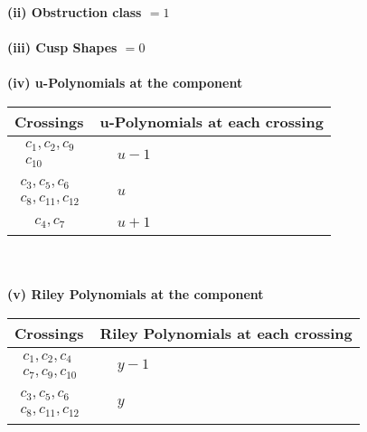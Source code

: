 \documentclass[1p]{elsarticle_modified}
\theoremstyle{definition}
\begin{document}
\flushleft \textbf{(ii) Obstruction class $= 1$}\\~\\
\flushleft \textbf{(iii) Cusp Shapes $= 0$}\\~\\
\newpage\renewcommand{\arraystretch}{1}
\flushleft \textbf{(iv) u-Polynomials at the component}\newline \\
\begin{tabular}{m{50pt}|m{274pt}}
Crossings & \hspace{64pt}u-Polynomials at each crossing \\
\hline $$\begin{aligned}c_{1},c_{2},c_{9}\\c_{10}\end{aligned}$$&$\begin{aligned}
&u-1
\end{aligned}$\\
\hline $$\begin{aligned}c_{3},c_{5},c_{6}\\c_{8},c_{11},c_{12}\end{aligned}$$&$\begin{aligned}
&u
\end{aligned}$\\
\hline $$\begin{aligned}c_{4},c_{7}\end{aligned}$$&$\begin{aligned}
&u+1
\end{aligned}$\\
\hline
\end{tabular}\\~\\
\newpage\renewcommand{\arraystretch}{1}
\flushleft \textbf{(v) Riley Polynomials at the component}\newline \\
\begin{tabular}{m{50pt}|m{274pt}}
Crossings & \hspace{64pt}Riley Polynomials at each crossing \\
\hline $$\begin{aligned}c_{1},c_{2},c_{4}\\c_{7},c_{9},c_{10}\end{aligned}$$&$\begin{aligned}
&y-1
\end{aligned}$\\
\hline $$\begin{aligned}c_{3},c_{5},c_{6}\\c_{8},c_{11},c_{12}\end{aligned}$$&$\begin{aligned}
&y
\end{aligned}$\\
\hline
\end{tabular}\\~\\
\end{document}
